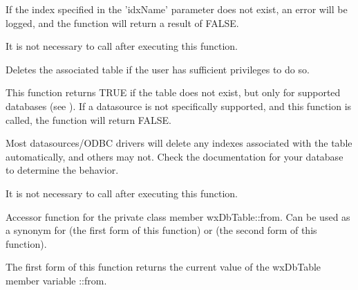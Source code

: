 
If the index specified in the 'idxName' parameter does not exist, an error
will be logged, and the function will return a result of FALSE.

It is not necessary to call 
after executing this function.

\label{wxdbtabledroptable}


Deletes the associated table if the user has sufficient privileges to do so.


This function returns TRUE if the table does not exist, but only for
supported databases (see ).  If a datasource
is not specifically supported, and this function is called, the function
will return FALSE.

Most datasources/ODBC drivers will delete any indexes associated with the
table automatically, and others may not.  Check the documentation for your
database to determine the behavior.

It is not necessary to call 
after executing this function.

\label{wxdbtablefrom}



Accessor function for the private class member wxDbTable::from.  Can be used
as a synonym for 
(the first form of this function) or
 (the second form
of this function).




The first form of this function returns the current value of the wxDbTable
member variable ::from.

